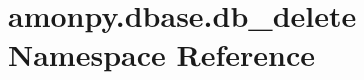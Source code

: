 \hypertarget{namespaceamonpy_1_1dbase_1_1db__delete}{\section{amonpy.\-dbase.\-db\-\_\-delete Namespace Reference}
\label{namespaceamonpy_1_1dbase_1_1db__delete}
}
